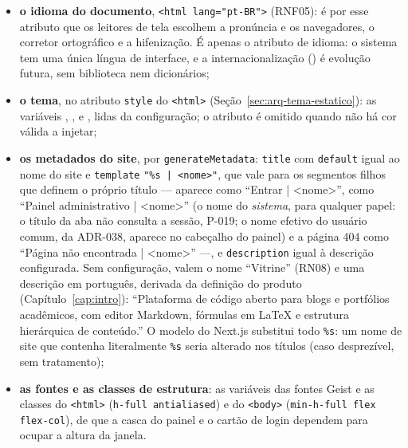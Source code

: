 \begin{itemize}
  \item \textbf{o idioma do documento}, \texttt{<html lang="pt-BR">} (RNF05): é por esse atributo que os leitores de tela escolhem a pronúncia e os navegadores, o corretor ortográfico e a hifenização. É apenas o atributo de idioma: o sistema tem uma única língua de interface, e a internacionalização () é evolução futura, sem biblioteca nem dicionários;
  \item \textbf{o tema}, no atributo \texttt{style} do \texttt{<html>} (Seção~\ref{sec:arq-tema-estatico}): as variáveis , ,  e , lidas da configuração; o atributo é omitido quando não há cor válida a injetar;
  \item \textbf{os metadados do site}, por \texttt{generateMetadata}: \texttt{title} com \texttt{default} igual ao nome do site e \texttt{template} \texttt{"\%s | <nome>"}, que vale para os segmentos filhos que definem o próprio título ---  aparece como ``Entrar | <nome>'',  como ``Painel administrativo | <nome>'' (o nome do \emph{sistema}, para qualquer papel: o título da aba não consulta a sessão, P-019; o nome efetivo do usuário comum, da ADR-038, aparece no cabeçalho do painel) e a página 404 como ``Página não encontrada | <nome>'' ---, e \texttt{description} igual à descrição configurada. Sem configuração, valem o nome ``Vitrine'' (RN08) e uma descrição em português, derivada da definição do produto (Capítulo~\ref{cap:intro}): ``Plataforma de código aberto para blogs e portfólios acadêmicos, com editor Markdown, fórmulas em LaTeX e estrutura hierárquica de conteúdo.'' O modelo do Next.js substitui todo \texttt{\%s}: um nome de site que contenha literalmente \texttt{\%s} seria alterado nos títulos (caso desprezível, sem tratamento);
  \item \textbf{as fontes e as classes de estrutura}: as variáveis das fontes Geist e as classes do \texttt{<html>} (\texttt{h-full antialiased}) e do \texttt{<body>} (\texttt{min-h-full flex flex-col}), de que a casca do painel e o cartão de login dependem para ocupar a altura da janela.
\end{itemize}

